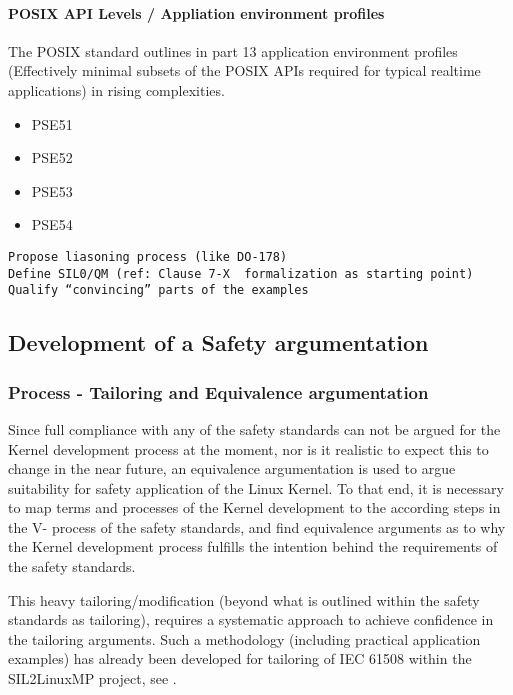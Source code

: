 \documentclass[12pt]{ElisaPaper}
\begin{document}
\paragraph{POSIX API Levels / Appliation environment profiles}
The POSIX standard  \cite{IEEE1003.1:2010} outlines in part 13 \cite{IEEE1003.13:2003} application environment profiles (Effectively minimal subsets of the POSIX APIs required for typical realtime applications) in rising complexities.
\begin{itemize}
\item PSE51
\item PSE52
\item PSE53
\item PSE54
\end{itemize}

\begin{verbatim}
Propose liasoning process (like DO-178)
Define SIL0/QM (ref: Clause 7-X  formalization as starting point)
Qualify “convincing” parts of the examples  
\end{verbatim}

\subsection{Development of a Safety argumentation}
\subsubsection{Process - Tailoring and Equivalence argumentation}
Since full compliance with any of the safety standards can not be argued for the Kernel development process at the moment, nor is it realistic to expect this to change in the near future, an equivalence argumentation is used to argue suitability for safety application of the Linux Kernel.
To that end, it is necessary to map terms and processes of the Kernel development to the according steps in the V- process of the safety standards, and find equivalence arguments as to why the Kernel development process fulfills the intention behind the requirements of the safety standards. 

This heavy tailoring/modification (beyond what is outlined within the safety standards as tailoring), requires a systematic approach to achieve confidence in the tailoring arguments.
Such a methodology (including practical application examples) has already been developed for tailoring of IEC 61508 within the SIL2LinuxMP project, see \cite{AnnexQR}.
\end{document}
